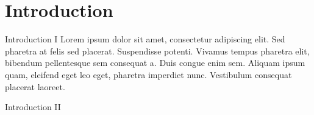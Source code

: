 \section{Introduction}
\begin{frame}{Introduction I}
    \vspace*{\fill} 
        Lorem ipsum dolor sit amet, consectetur adipiscing elit. Sed pharetra at felis sed placerat. Suspendisse potenti. Vivamus tempus pharetra elit, bibendum pellentesque sem consequat a. Duis congue enim sem. Aliquam ipsum quam, eleifend eget leo eget, pharetra imperdiet nunc. Vestibulum consequat placerat laoreet.
    \vspace*{\fill} 
\end{frame}

\begin{frame}{Introduction II}
    
\end{frame}